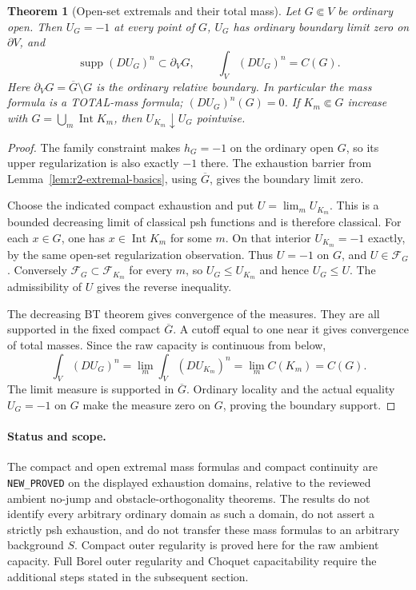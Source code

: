 \documentclass[11pt,a4paper]{article}
\numberwithin{equation}{section}
\newtheorem{theorem}{Theorem}[section]
\theoremstyle{definition}
\theoremstyle{remark}
\begin{document}
\begin{theorem}[Open-set extremals and their total mass]
\label{thm:r2-open-extremal}
Let $G\Subset V$ be ordinary open. Then $U_G=-1$ at every
point of $G$, $U_G$ has ordinary boundary limit zero on
$\partial V$, and
\[
 \operatorname{supp}(DU_G)^n\subset\partial_VG,
 \qquad
 \int_V(DU_G)^n=C(G).
\]
Here $\partial_VG=\overline G\setminus G$ is the ordinary
relative boundary. In particular the mass formula is a
TOTAL-mass formula; $(DU_G)^n(G)=0$.
If $K_m\Subset G$ increase with
$G=\bigcup_m\operatorname{Int}K_m$, then
$U_{K_m}\downarrow U_G$ pointwise.
\end{theorem}

\begin{proof}
The family constraint makes $h_G=-1$ on the ordinary open
$G$, so its upper regularization is also exactly $-1$
there. The exhaustion barrier from
Lemma~\ref{lem:r2-extremal-basics}, using $\overline G$,
gives the boundary limit zero.

Choose the indicated compact exhaustion and put
$U=\lim_m U_{K_m}$. This is a bounded decreasing limit
of classical psh functions and is therefore classical.
For each $x\in G$, one has $x\in\operatorname{Int}K_m$
for some $m$. On that interior $U_{K_m}=-1$ exactly,
by the same open-set regularization observation.
Thus $U=-1$ on $G$, and $U\in\mathcal F_G$.
Conversely $\mathcal F_G\subset\mathcal F_{K_m}$ for
every $m$, so $U_G\leq U_{K_m}$ and hence $U_G\leq U$.
The admissibility of $U$ gives the reverse inequality.

The decreasing BT theorem gives convergence of the measures.
They are all supported in the fixed compact $\overline G$.
A cutoff equal to one near it gives convergence of total
masses. Since the raw capacity is continuous from below,
\[
 \int_V(DU_G)^n
 =\lim_m\int_V(DU_{K_m})^n
 =\lim_m C(K_m)=C(G).
\]
The limit measure is supported in $\overline G$. Ordinary
locality and the actual equality $U_G=-1$ on $G$ make
the measure zero on $G$, proving the boundary support.
\end{proof}

\paragraph{Status and scope.}
The compact and open extremal mass formulas and compact
continuity are \texttt{NEW\_PROVED} on the displayed
exhaustion domains, relative to the reviewed ambient no-jump
and obstacle-orthogonality theorems. The results do not
identify every arbitrary ordinary domain as such a domain,
do not assert a strictly psh exhaustion, and do not transfer
these mass formulas to an arbitrary background $S$.
Compact outer regularity is proved here for the raw ambient
capacity. Full Borel outer regularity and Choquet
capacitability require the additional steps stated in the
subsequent section.
\end{document}
